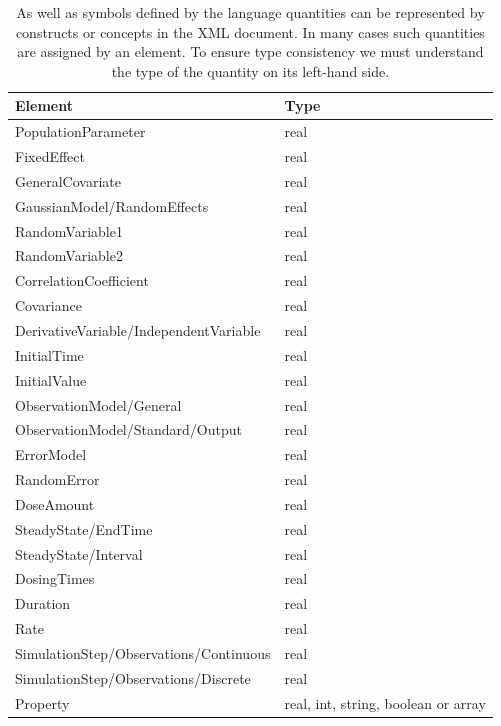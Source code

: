 \begin{table}[ht!]
\begin{center}
\small
\begin{tabular}{ll}\toprule
Element & Type \\\midrule
PopulationParameter & real \\
FixedEffect & real \\
GeneralCovariate & real \\
GaussianModel/\-RandomEffects & real \\
RandomVariable1 & real \\
RandomVariable2 & real \\
CorrelationCoefficient & real \\
Covariance & real \\
DerivativeVariable/\-IndependentVariable & real \\
InitialTime & real\\
InitialValue & real\\
ObservationModel/\-General &  real \\
ObservationModel/\-Standard/\-Output & real \\
ErrorModel & real \\
RandomError & real \\
DoseAmount & real \\
SteadyState/EndTime & real \\
SteadyState/Interval & real \\
DosingTimes & real \\
Duration & real \\
Rate & real \\
SimulationStep/Observations/\-Continuous & real\\
SimulationStep/Observations/\-Discrete & real\\
Property & real, int, string, boolean or array\\\bottomrule
\end{tabular}
\end{center}
\caption{As well as symbols defined by the language quantities can be
represented by constructs or concepts in the XML document. In many
cases such quantities are assigned by an  element. To
ensure type consistency we must understand the type of the quantity on
its left-hand side.}
\label{tab:element-types}
\end{table}%


